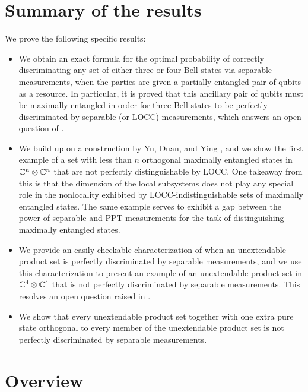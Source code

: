 \section{Summary of the results}
We prove the following specific results:
\begin{itemize}
\item We obtain an exact formula for the optimal probability of correctly 
discriminating any set of either three or four Bell states via separable 
measurements, when the parties are given a partially entangled pair of qubits as a resource. 
In particular, it is proved that this ancillary pair of qubits must be maximally 
entangled in order for three Bell states to be perfectly discriminated
by separable (or LOCC) measurements, which answers an open question of \cite{Yu14}.
\item We build up on a construction by Yu, Duan, and Ying \cite{Yu12}, and we show
the first example of a set with less than $n$ orthogonal maximally entangled states 
in $\mathbb{C}^{n}\otimes\mathbb{C}^{n}$ that are not perfectly distinguishable by LOCC.
One takeaway from this is that the dimension of the local subsystems does not 
play any special role in the nonlocality exhibited by LOCC-indistinguishable sets of 
maximally entangled states. 
The same example serves to exhibit a gap between the power of separable and PPT measurements
for the task of distinguishing maximally entangled states.
\item We provide an easily checkable characterization of when an unextendable 
product set is perfectly discriminated by separable measurements, and we use
this characterization to present an example of an unextendable product set in
$\mathbb{C}^{4}\otimes\mathbb{C}^{4}$ that is not perfectly discriminated by 
separable measurements. This resolves an open question raised in
\cite{Duan09}. 
\item We show that every unextendable product set together 
with one extra pure state orthogonal to every member of the unextendable product 
set is not perfectly discriminated by separable measurements.
\end{itemize}

\section{Overview}

